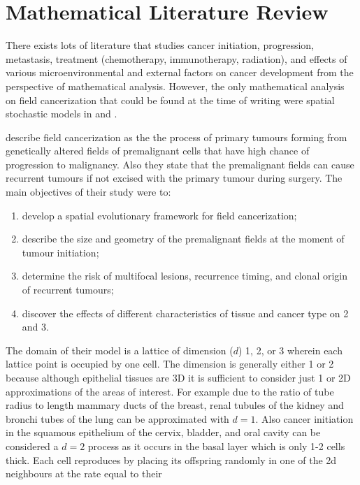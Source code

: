 \documentclass[\main/thesis.tex]{subfiles}
\begin{document}
\section{Mathematical Literature Review}

There exists lots of literature that studies cancer initiation, progression, 
metastasis, treatment (chemotherapy, immunotherapy, radiation), 
and effects of various microenvironmental and external factors on cancer 
development from the perspective of mathematical analysis. However, the only 
mathematical analysis on field cancerization that could be found at the time of 
writing were spatial stochastic models in \textcite{Foo} and \textcite{Ryser}.

\textcite{Foo} describe field cancerization as the the process of primary 
tumours forming from genetically altered fields of premalignant cells that have 
high chance of progression to malignancy. Also they state that the premalignant 
fields can cause recurrent tumours if not excised with the primary tumour during 
surgery. The main objectives of their study were to:
\begin{enumerate}
  \item develop a spatial evolutionary framework for field cancerization;
  \item describe the size and geometry of the premalignant fields at the moment 
        of tumour initiation;
  \item determine the risk of multifocal lesions, recurrence timing, and clonal 
        origin of recurrent tumours;
  \item discover the effects of different characteristics of tissue and cancer 
        type on 2 and 3.
\end{enumerate}
The domain of their model is a lattice of dimension ($d$) 1, 2, or 3 wherein 
each lattice point is occupied by one cell. The dimension is generally either 1 
or 2 because although epithelial tissues are 3D it is sufficient to consider 
just 1 or 2D approximations of the areas of interest. For example due to the 
ratio of tube radius to length mammary ducts of the breast, renal tubules of the 
kidney and bronchi tubes of the lung can be approximated with $d{=}1$. Also 
cancer initiation in the squamous epithelium of the cervix, bladder, and oral 
cavity can be considered a $d {=} 2$ process as it occurs in the basal layer 
which is only 1-2 cells thick. Each cell reproduces by placing its 
offspring randomly in one of the 2d neighbours at the rate equal to their 
\end{document}
